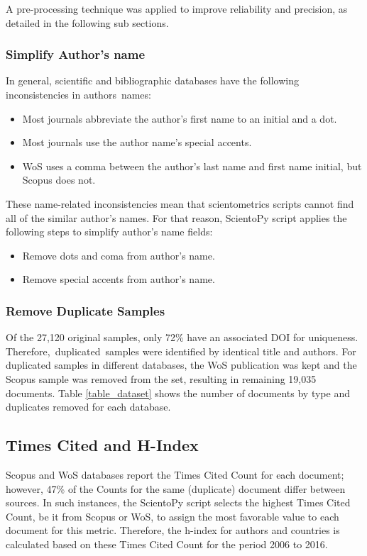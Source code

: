 \documentclass[symmetry,article,accept,moreauthors,pdftex10pt,a4paper]{mdpi}
\begin{document}
A pre-processing technique was applied to improve reliability and precision, as detailed in the following sub sections.

\subsubsection{Simplify Author's name}

In general, scientific and bibliographic databases have the following inconsistencies in authors~names:

\begin{itemize}
\item Most journals abbreviate the author's first name to an initial and a dot.
\item Most journals use the author name's special accents.
\item WoS uses a comma between the author's last name and first name initial, but Scopus does not. 
\end{itemize} 

These name-related inconsistencies mean that scientometrics scripts cannot find all of the similar author's names. For that reason, ScientoPy script applies the following steps to simplify author's name fields:

\begin{itemize}
\item Remove dots and coma from author's name.
\item Remove special accents from author's name.
\end{itemize}

\subsubsection{Remove Duplicate Samples}

Of the 27,120 original samples, only 72\% have an associated DOI for uniqueness. Therefore,~duplicated~samples were identified by identical title and authors. For duplicated samples in different databases, the WoS publication was kept and the Scopus sample was removed from the set, resulting in remaining 19,035 documents. Table \ref{table_dataset} shows the number of documents by type and duplicates removed for each database. 


\subsection{Times Cited and H-Index}

Scopus and WoS databases report the Times Cited Count for each document; however, 47\% of the Counts for the same (duplicate) document differ between sources. In such instances, the ScientoPy script selects the highest Times Cited Count, be it from Scopus or WoS, to assign the most favorable value to each document for this metric. Therefore, the h-index for authors and countries is calculated based on these Times Cited Count for the period 2006 to 2016.
\end{document}
